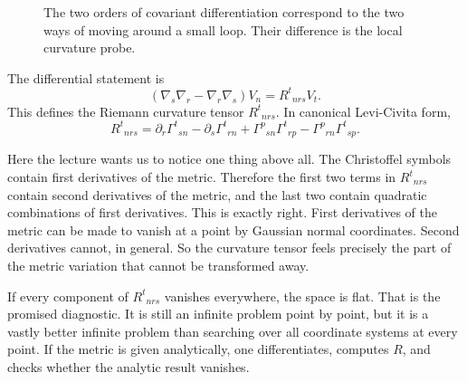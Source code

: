 \begin{figure}[h]
\centering
{}
\caption{The two orders of covariant differentiation correspond to the two ways of moving around a small loop. Their difference is the local curvature probe.}
\end{figure}

The differential statement is
\begin{equation}
(\nabla_s\nabla_r-\nabla_r\nabla_s)V_n
=
R^{t}{}_{nrs}V_t.
\end{equation}
This defines the Riemann curvature tensor \(R^{t}{}_{nrs}\). In canonical Levi-Civita form,
\begin{equation}
R^{t}{}_{nrs}
=
\partial_r\Gamma^{t}{}_{sn}
-
\partial_s\Gamma^{t}{}_{rn}
+
\Gamma^{p}{}_{sn}\Gamma^{t}{}_{rp}
-
\Gamma^{p}{}_{rn}\Gamma^{t}{}_{sp}.
\end{equation}

Here the lecture wants us to notice one thing above all. The Christoffel symbols contain first derivatives of the metric. Therefore the first two terms in \(R^{t}{}_{nrs}\) contain second derivatives of the metric, and the last two contain quadratic combinations of first derivatives. This is exactly right. First derivatives of the metric can be made to vanish at a point by Gaussian normal coordinates. Second derivatives cannot, in general. So the curvature tensor feels precisely the part of the metric variation that cannot be transformed away.

If every component of \(R^{t}{}_{nrs}\) vanishes everywhere, the space is flat. That is the promised diagnostic. It is still an infinite problem point by point, but it is a vastly better infinite problem than searching over all coordinate systems at every point. If the metric is given analytically, one differentiates, computes \(R\), and checks whether the analytic result vanishes.

